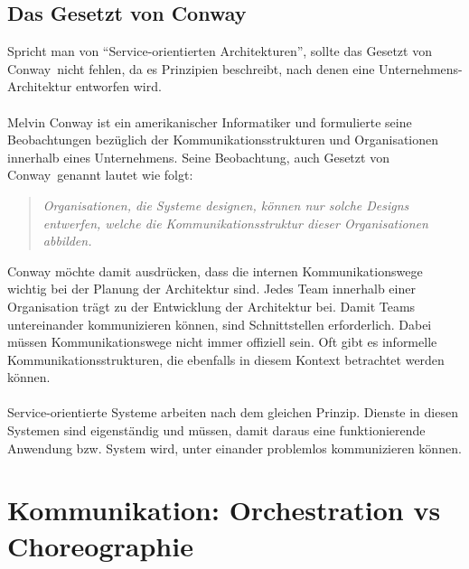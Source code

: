 \subsection{Das Gesetzt von Conway}
\label{subsec:conway}
Spricht man von "`Service-orientierten Architekturen"', sollte das \glqq Gesetzt von Conway\grqq\ nicht fehlen, da es Prinzipien beschreibt, nach denen eine Unternehmens-Architektur entworfen wird.
\\\\
Melvin Conway ist ein amerikanischer Informatiker und formulierte seine Beobachtungen bezüglich der Kommunikationsstrukturen und Organisationen innerhalb eines Unternehmens. Seine Beobachtung, auch \glqq Gesetzt von Conway\grqq\ genannt lautet wie folgt:
\begin{quotation}
    \textit{Organisationen, die Systeme designen, können nur solche Designs entwerfen, welche die Kommunikationsstruktur dieser Organisationen abbilden.}
\end{quotation}

Conway möchte damit ausdrücken, dass die internen Kommunikationswege wichtig bei der Planung der Architektur sind. Jedes Team innerhalb einer Organisation trägt zu der Entwicklung der Architektur bei. Damit Teams untereinander kommunizieren können, sind Schnittstellen erforderlich. Dabei müssen Kommunikationswege nicht immer offiziell sein. Oft gibt es informelle Kommunikationsstrukturen, die ebenfalls in diesem Kontext betrachtet werden können.
\\\\
Service-orientierte Systeme arbeiten nach dem gleichen Prinzip. Dienste in diesen Systemen sind eigenständig und müssen, damit daraus eine funktionierende Anwendung bzw. System wird, unter einander problemlos kommunizieren können.

\section{Kommunikation: Orchestration vs Choreographie}
\label{sec:OrchestrationVsChoregraphie}

